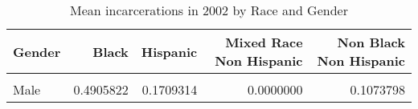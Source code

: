 \begin{table}[H]

\caption{\label{tab:tab:summarystats}Mean incarcerations in 2002 by Race and Gender}
\centering
\begin{tabular}[t]{lrrrr}
\toprule
Gender & Black & Hispanic & Mixed Race Non Hispanic & Non Black Non Hispanic\\
\midrule
\cellcolor{gray!6}{Female} & \cellcolor{gray!6}{0.0206009} & \cellcolor{gray!6}{0.0292524} & \cellcolor{gray!6}{0.1395349} & \cellcolor{gray!6}{0.0240000}\\
Male & 0.4905822 & 0.1709314 & 0.0000000 & 0.1073798\\
\bottomrule
\end{tabular}
\end{table}
